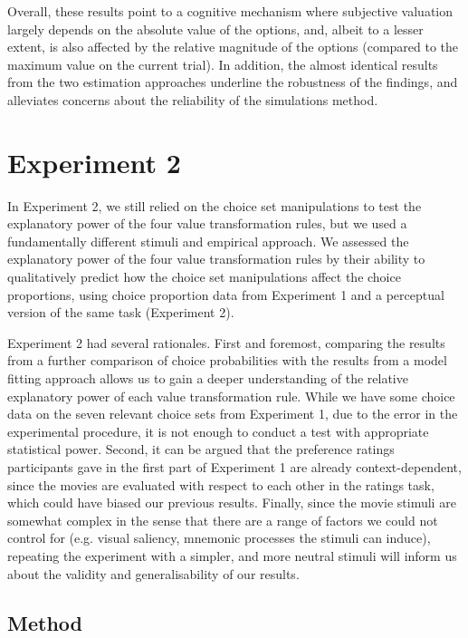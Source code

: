 \documentclass[11pt,a4paper]{article}
\begin{document}
Overall, these results point to a cognitive mechanism where subjective valuation largely depends on the absolute value of the options, and, albeit to a lesser extent, is also affected by the relative magnitude of the options (compared to the maximum value on the current trial). In addition, the almost identical results from the two estimation approaches underline the robustness of the findings, and alleviates concerns about the reliability of the simulations method.

 
 
\section{Experiment 2}

In Experiment 2, we still relied on the choice set manipulations to test the explanatory power of the four value transformation rules, but we used a fundamentally different stimuli and empirical approach. We assessed the explanatory power of the four value transformation rules by their ability to qualitatively predict how the choice set manipulations affect the choice proportions, using choice proportion data from Experiment 1 and a perceptual version of the same task (Experiment 2). 

Experiment 2 had several rationales. First and foremost, comparing the results from a further comparison of choice probabilities with the results from a model fitting approach allows us to gain a deeper understanding of the relative explanatory power of each value transformation rule. While we have some choice data on the seven relevant choice sets from Experiment 1, due to the error in the experimental procedure, it is not enough to conduct a test with appropriate statistical power. Second, it can be argued that the preference ratings participants gave in the first part of Experiment 1 are already context-dependent, since the movies are evaluated with respect to each other in the ratings task, which could have biased our previous results. Finally, since the movie stimuli are somewhat complex in the sense that there are a range of factors we could not control for (e.g. visual saliency, mnemonic processes the stimuli can induce), repeating the experiment with a simpler, and more neutral stimuli will inform us about the validity and generalisability of our results. 

\subsection{Method}
\end{document}
